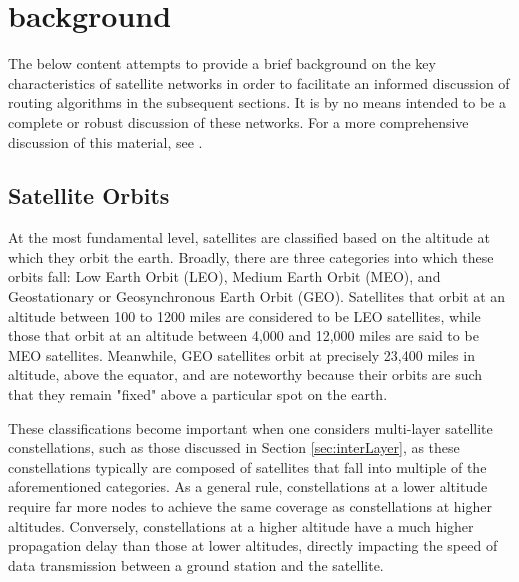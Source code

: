 
\section{background}\label{sec:background}
The below content attempts to provide a brief background on the key characteristics of satellite networks in order to facilitate an informed discussion of routing algorithms in the subsequent sections. It is by no means intended to be a complete or robust discussion of these networks. For a more comprehensive discussion of this material, see \cite{elbert_introduction_2008}.

\subsection{Satellite Orbits}\label{subsec:satelliteOrbits}
At the most fundamental level, satellites are classified based on the altitude at which they orbit the earth. Broadly, there are three categories into which these orbits fall: Low Earth Orbit (LEO), Medium Earth Orbit (MEO), and Geostationary or Geosynchronous Earth Orbit (GEO)\cite{stone_introduction_2004}. Satellites that orbit at an altitude between 100 to 1200 miles are considered to be LEO satellites, while those that orbit at an altitude between 4,000 and 12,000 miles are said to be MEO satellites\cite{stone_introduction_2004}. Meanwhile, GEO satellites orbit at precisely 23,400 miles in altitude, above the equator, and are noteworthy because their orbits are such that they remain "fixed" above a particular spot on the earth\cite{stone_introduction_2004}. 

These classifications become important when one considers multi-layer satellite constellations, such as those discussed in Section \ref{sec:interLayer}, as these constellations typically are composed of satellites that fall into multiple of the aforementioned categories. As a general rule, constellations at a lower altitude require far more nodes to achieve the same coverage as constellations at higher altitudes\cite{elbert_introduction_2008}. Conversely, constellations at a higher altitude have a much higher propagation delay than those at lower altitudes, directly impacting the speed of data transmission between a ground station and the satellite\cite{elbert_introduction_2008}.

